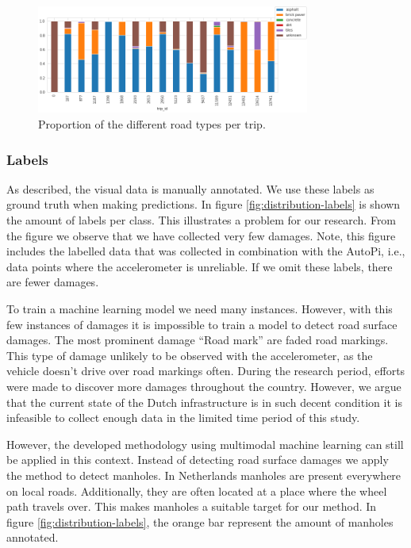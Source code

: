 \begin{figure}[ht]
\centering
\includegraphics[width=0.8\textwidth,keepaspectratio]{images/4_data/proportion-road-types.png}
\captionsetup{width=.90\textwidth}
\caption{Proportion of the different road types per trip.}
\label{fig:proportion-road-types}
\end{figure}


\subsubsection{Labels}

As described, the visual data is manually annotated. We use these labels as ground truth when making predictions. In figure \ref{fig:distribution-labels} is shown the amount of labels per class. This illustrates a problem for our research. From the figure we observe that we have collected very few damages. Note, this figure includes the labelled data that was collected in combination with the AutoPi, i.e., data points where the accelerometer is unreliable. If we omit these labels, there are fewer damages.

To train a machine learning model we need many instances. However, with this few instances of damages it is impossible to train a model to detect road surface damages. The most prominent damage ``Road mark'' are faded road markings. This type of damage unlikely to be observed with the accelerometer, as the vehicle doesn't drive over road markings often. During the research period, efforts were made to discover more damages throughout the country. However, we argue that the current state of the Dutch infrastructure is in such decent condition it is infeasible to collect enough data in the limited time period of this study.

However, the developed methodology using multimodal machine learning can still be applied in this context. Instead of detecting road surface damages we apply the method to detect manholes. In Netherlands manholes are present everywhere on local roads. Additionally, they are often located at a place where the wheel path travels over. This makes manholes a suitable target for our method. In figure \ref{fig:distribution-labels}, the orange bar represent the amount of manholes annotated.

